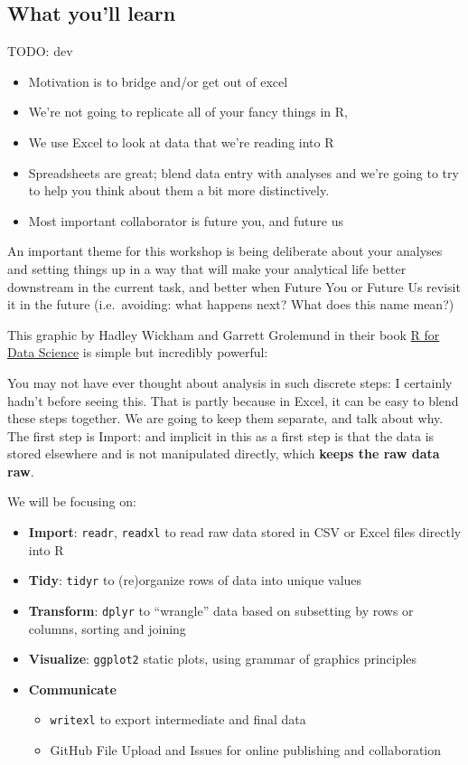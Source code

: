 \documentclass[]{book}
\providecommand{\tightlist}{%
  \setlength{\itemsep}{0pt}\setlength{\parskip}{0pt}}
\begin{document}
\hypertarget{what-youll-learn}{%
\subsection{What you'll learn}\label{what-youll-learn}}

TODO: dev

\begin{itemize}
\tightlist
\item
  Motivation is to bridge and/or get out of excel
\item
  We're not going to replicate all of your fancy things in R,
\item
  We use Excel to look at data that we're reading into R
\item
  Spreadsheets are great; blend data entry with analyses and we're going to try to help you think about them a bit more distinctively.
\item
  Most important collaborator is future you, and future us
\end{itemize}

An important theme for this workshop is being deliberate about your analyses and setting things up in a way that will make your analytical life better downstream in the current task, and better when Future You or Future Us revisit it in the future (i.e.~avoiding: what happens next? What does this name mean?)

This graphic by Hadley Wickham and Garrett Grolemund in their book \href{http://r4ds.had.co.nz/}{R for Data Science} is simple but incredibly powerful:

You may not have ever thought about analysis in such discrete steps: I certainly hadn't before seeing this. That is partly because in Excel, it can be easy to blend these steps together. We are going to keep them separate, and talk about why. The first step is Import: and implicit in this as a first step is that the data is stored elsewhere and is not manipulated directly, which \textbf{keeps the raw data raw}.

We will be focusing on:

\begin{itemize}
\tightlist
\item
  \textbf{Import}: \texttt{readr}, \texttt{readxl} to read raw data stored in CSV or Excel files directly into R
\item
  \textbf{Tidy}: \texttt{tidyr} to (re)organize rows of data into unique values
\item
  \textbf{Transform}: \texttt{dplyr} to ``wrangle'' data based on subsetting by rows or columns, sorting and joining
\item
  \textbf{Visualize}: \texttt{ggplot2} static plots, using grammar of graphics principles
\item
  \textbf{Communicate}

  \begin{itemize}
  \tightlist
  \item
    \texttt{writexl} to export intermediate and final data
  \item
    GitHub File Upload and Issues for online publishing and collaboration
  \end{itemize}
\end{itemize}
\end{document}
